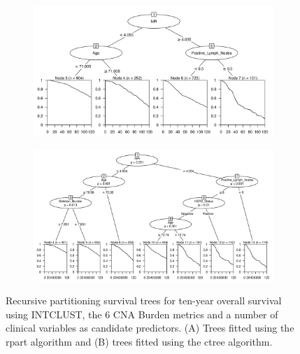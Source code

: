 \begin{figure}[!htb]
\centering

\vspace{1cm}

\begin{subfigure}{\textwidth}
\subcaption{}
\includegraphics[width=1\textwidth]{../figures/Appendices/Appendix_B/Clin_PartyKit_Survival_Burden_TenYearOS_INTCLUST.png}
\end{subfigure}

\vspace{2cm}

\begin{subfigure}{\textwidth}
\subcaption{}
\includegraphics[width=1\textwidth]{../figures/Appendices/Appendix_B/Clin_Ctree_Survival_Burden_TenYearOS_INTCLUST.png}
\end{subfigure}

\vspace{1cm}

\caption[Recursive partitioning survival trees for ten-year overall survival using INTCLUST, the 6 CNA Burden metrics and a number of clinical variables as candidate predictors.]{Recursive partitioning survival trees for ten-year overall survival using INTCLUST, the 6 CNA Burden metrics and a number of clinical variables as candidate predictors. (A) Trees fitted using the rpart algorithm and (B) trees fitted using the ctree algorithm.}
\end{figure}

